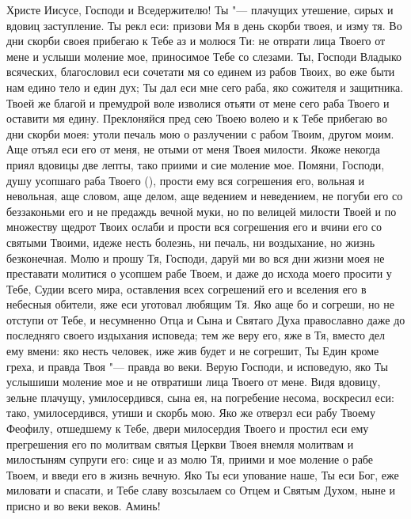 \begin{mymulticols}
 

Христе Иисусе, Господи и Вседержителю! Ты "--- плачущих утешение, сирых и вдовиц заступление. Ты рекл еси: призови Мя в день скорби твоея, и изму тя. Во дни скорби своея прибегаю к Тебе аз и молюся Ти: не отврати лица Твоего от мене и услыши моление мое, приносимое Тебе со слезами. Ты, Господи Владыко всяческих, благословил еси сочетати мя со единем из рабов Твоих, во еже быти нам едино тело и един дух; Ты дал еси мне сего раба, яко сожителя и защитника. Твоей же благой и премудрой воле изволися отьяти от мене сего раба Твоего и оставити мя едину. Преклоняйся пред сею Твоею волею и к Тебе прибегаю во дни скорби моея: утоли печаль мою о разлучении с рабом Твоим, другом моим. Аще отъял еси его от меня, не отыми от меня Твоея милости. Якоже некогда приял вдовицы две лепты, тако приими и сие моление мое. Помяни, Господи, душу усопшаго раба Твоего (), прости ему вся согрешения его, вольная и невольная, аще словом, аще делом, аще ведением и неведением, не погуби его со беззаконьми его и не предаждь вечной муки, но по велицей милости Твоей и по множеству щедрот Твоих ослаби и прости вся согрешения его и вчини его со святыми Твоими, идеже несть болезнь, ни печаль, ни воздыхание, но жизнь безконечная. Молю и прошу Тя, Господи, даруй ми во вся дни жизни моея не преставати молитися о усопшем рабе Твоем, и даже до исхода моего просити у Тебе, Судии всего мира, оставления всех согрешений его и вселения его в небесныя обители, яже еси уготовал любящим Тя. Яко аще бо и согреши, но не отступи от Тебе, и несумненно Отца и Сына и Святаго Духа православно даже до последняго своего издыхания исповеда; тем же веру его, яже в Тя, вместо дел ему вмени: яко несть человек, иже жив будет и не согрешит, Ты Един кроме греха, и правда Твоя "--- правда во веки. Верую Господи, и исповедую, яко Ты услышиши моление мое и не отвратиши лица Твоего от мене. Видя вдовицу, зельне плачущу, умилосердився, сына ея, на погребение несома, воскресил еси: тако, умилосердився, утиши и скорбь мою. Яко же отверзл еси рабу Твоему Феофилу, отшедшему к Тебе, двери милосердия Твоего и простил еси ему прегрешения его по молитвам святыя Церкви Твоея внемля молитвам и милостыням супруги его: сице и аз молю Тя, приими и мое моление о рабе Твоем, и введи его в жизнь вечную. Яко Ты еси упование наше, Ты еси Бог, еже миловати и спасати, и Тебе славу возсылаем со Отцем и Святым Духом, ныне и присно и во веки веков. Аминь!

\end{mymulticols}

